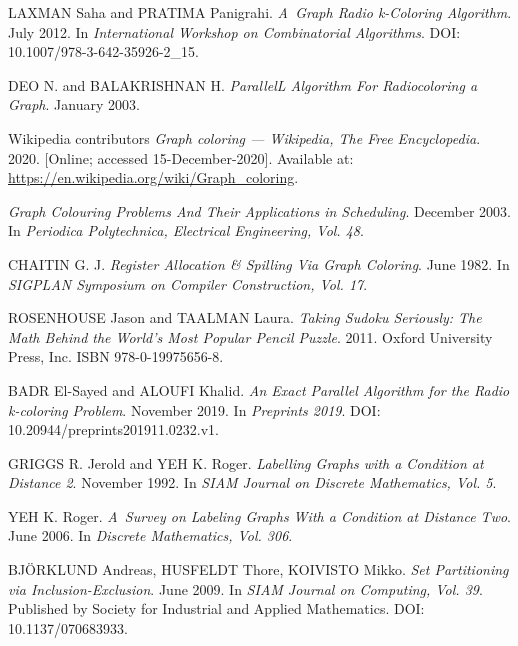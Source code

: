 \documentclass[11pt,a4paper]{article}
\begin{document}

\begin{thebibliography}{1}
    LAXMAN Saha and PRATIMA Panigrahi. \textit{A~Graph Radio k-Coloring Algorithm}. July 2012. In \emph{International Workshop on Combinatorial Algorithms}. DOI: 10.1007/978-3-642-35926-2\_15.

    DEO N. and BALAKRISHNAN H. \textit{ParallelL Algorithm For Radiocoloring a Graph}. January 2003.

    Wikipedia contributors \textit{Graph coloring --- {Wikipedia}{,} The Free Encyclopedia}. 2020. [Online; accessed 15-December-2020]. Available at: \url{https://en.wikipedia.org/wiki/Graph_coloring}.

    \emph{Graph Colouring Problems And Their Applications in Scheduling}. December 2003. In \emph{Periodica Polytechnica, Electrical Engineering, Vol. 48}.

    CHAITIN G. J. \emph{Register Allocation \& Spilling Via Graph Coloring}. June 1982. In \emph{SIGPLAN Symposium on Compiler Construction, Vol. 17}.

    ROSENHOUSE Jason and TAALMAN Laura. \emph{Taking Sudoku Seriously: The Math Behind the World's Most Popular Pencil Puzzle}. 2011. Oxford University Press, Inc. ISBN 978-0-19975656-8.

    BADR El-Sayed and ALOUFI Khalid. \emph{An Exact Parallel Algorithm for the Radio k-coloring Problem}. November 2019. In \emph{Preprints 2019}. DOI: 10.20944/preprints201911.0232.v1.

    GRIGGS R. Jerold and YEH K. Roger. \emph{Labelling Graphs with a Condition at Distance 2}. November 1992. In \emph{SIAM Journal on Discrete Mathematics, Vol. 5}.

    YEH K. Roger. \emph{A~Survey on Labeling Graphs With a Condition at Distance Two}. June 2006. In \emph{Discrete Mathematics, Vol. 306}.

    BJ\"{O}RKLUND Andreas, HUSFELDT Thore, KOIVISTO Mikko. \emph{Set Partitioning via Inclusion-Exclusion}. June 2009. In \emph{SIAM Journal on Computing, Vol. 39}. Published by Society for Industrial and Applied Mathematics. DOI: 10.1137/070683933.


\end{thebibliography}
\end{document}
